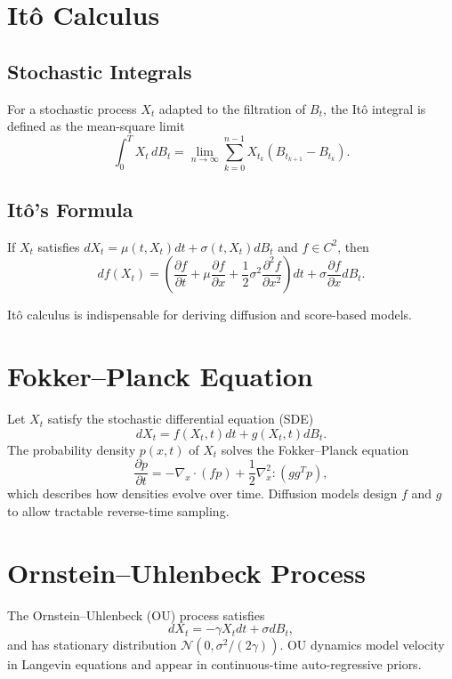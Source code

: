 \section{Itô Calculus}
\subsection{Stochastic Integrals}
For a stochastic process $X_t$ adapted to the filtration of $B_t$, the Itô integral is defined as the mean-square limit
\begin{equation}
\int_0^T X_t \, dB_t = \lim_{n\to\infty} \sum_{k=0}^{n-1} X_{t_k} (B_{t_{k+1}}-B_{t_k}).
\end{equation}

\subsection{Itô's Formula}
\begin{theorem}
If $X_t$ satisfies $dX_t=\mu(t,X_t)dt+\sigma(t,X_t)dB_t$ and $f\in C^{2}$, then
\begin{equation}
df(X_t) = \left(\frac{\partial f}{\partial t}+\mu\frac{\partial f}{\partial x}+\frac{1}{2}\sigma^2\frac{\partial^2 f}{\partial x^2}\right)dt + \sigma\frac{\partial f}{\partial x} dB_t.
\end{equation}
\end{theorem}
Itô calculus is indispensable for deriving diffusion and score-based models.

\section{Fokker--Planck Equation}
Let $X_t$ satisfy the stochastic differential equation (SDE)
\begin{equation}
dX_t = f(X_t,t) dt + g(X_t,t) dB_t.
\end{equation}
The probability density $p(x,t)$ of $X_t$ solves the Fokker--Planck equation
\begin{equation}
\frac{\partial p}{\partial t} = -\nabla_x\cdot (f p) + \frac{1}{2}\nabla_x^2:(gg^T p),
\end{equation}
which describes how densities evolve over time. Diffusion models design $f$ and $g$ to allow tractable reverse-time sampling.

\section{Ornstein--Uhlenbeck Process}
The Ornstein--Uhlenbeck (OU) process satisfies
\begin{equation}
dX_t = -\gamma X_t dt + \sigma dB_t,
\end{equation}
and has stationary distribution $\mathcal{N}(0, \sigma^2/(2\gamma))$. OU dynamics model velocity in Langevin equations and appear in continuous-time auto-regressive priors.

